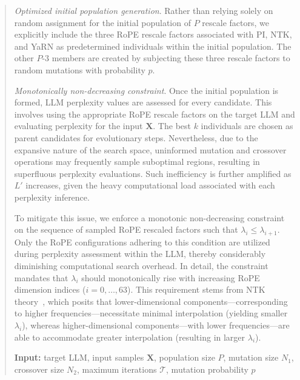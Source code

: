 \begin{abstract}
\textit{Optimized initial population generation}. Rather than relying solely on random assignment for the initial population of $P$ rescale factors, we explicitly include the three RoPE rescale factors associated with PI, NTK, and YaRN as predetermined individuals within the initial population. The other $P$-3 members are created by subjecting these three rescale factors to random mutations with probability $p$.

\textit{Monotonically non-decreasing constraint}. Once the initial population is formed, LLM perplexity values are assessed for every candidate. This involves using the appropriate RoPE rescale factors on the target LLM and evaluating perplexity for the input $\mathbf{X}$. The best $k$ individuals are chosen as parent candidates for evolutionary steps. Nevertheless, due to the expansive nature of the search space, uninformed mutation and crossover operations may frequently sample suboptimal regions, resulting in superfluous perplexity evaluations. Such inefficiency is further amplified as $L'$ increases, given the heavy computational load associated with each perplexity inference.

To mitigate this issue, we enforce a monotonic non-decreasing constraint on the sequence of sampled RoPE rescaled factors such that $\lambda_i \leq \lambda_{i+1}$. Only the RoPE configurations adhering to this condition are utilized during perplexity assessment within the LLM, thereby considerably diminishing computational search overhead. In detail, the constraint mandates that $\lambda_i$ should monotonically rise with increasing RoPE dimension indices ($i=0,\ldots,63$). This requirement stems from NTK theory~\cite{jacot2018neural,tancik2020fourier,ntk}, which posits that lower-dimensional components—corresponding to higher frequencies—necessitate minimal interpolation (yielding smaller $\lambda_i$), whereas higher-dimensional components—with lower frequencies—are able to accommodate greater interpolation (resulting in larger $\lambda_i$).

\begin{algorithm}[t]
	\small
	\caption{The search algorithm}
	\textbf{Input:} target LLM, input samples $\mathbf{X}$, population size $P$, mutation size $N_1$, crossover size $N_2$, maximum iterations $\mathcal{T}$, mutation probability $p$\\


\end{algorithm}
\end{abstract}
